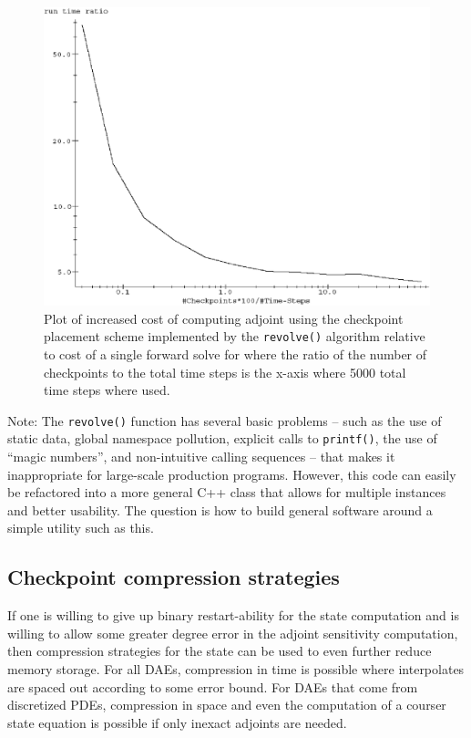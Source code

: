 \documentclass[pdf,ps2pdf,11pt]{SANDreport}
\begin{document}
{\bsinglespace
\begin{figure}
\begin{center}
\includegraphics*[scale=0.75]{checkpoint_graph}
\end{center}
\caption{
\label{rythmos:fig:checkpoint_graph}
Plot of increased cost of computing adjoint using the checkpoint placement
scheme implemented by the {}\texttt{revolve()} algorithm relative to cost of a
single forward solve for where the ratio of the number of checkpoints to the
total time steps is the x-axis where 5000 total time steps where used.  }
\end{figure}
\esinglespace}

Note: The {}\texttt{revolve()} function has several basic problems -- such as
the use of static data, global namespace pollution, explicit calls to
{}\texttt{printf()}, the use of ``magic numbers'', and non-intuitive calling
sequences -- that makes it inappropriate for large-scale production programs.
However, this code can easily be refactored into a more general C++ class that
allows for multiple instances and better usability.  The question is how to
build general software around a simple utility such as this.

\subsection{Checkpoint compression strategies}

If one is willing to give up binary restart-ability for the state computation
and is willing to allow some greater degree error in the adjoint sensitivity
computation, then compression strategies for the state can be used to even
further reduce memory storage.  For all DAEs, compression in time is possible
where interpolates are spaced out according to some error bound.  For DAEs
that come from discretized PDEs, compression in space and even the
computation of a courser state equation is possible if only inexact
adjoints are needed.
\end{document}
